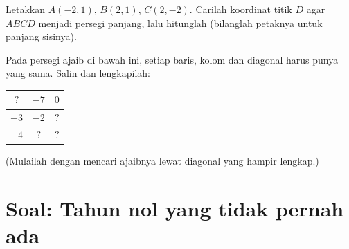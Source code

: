 \begin{exercise}[$\star\star$]\label{exo:g7:negatives:11}
Letakkan $A(-2, 1)$, $B(2, 1)$, $C(2, -2)$. Carilah koordinat titik
$D$ agar $ABCD$ menjadi persegi panjang, lalu hitunglah 
(bilanglah petaknya untuk panjang sisinya).
\end{exercise}

\begin{exercise}[$\star\star\star$]\label{exo:g7:negatives:12}
Pada persegi ajaib di bawah ini, setiap baris, kolom dan diagonal
harus punya  yang sama. Salin dan lengkapilah:
\begin{center}
\renewcommand{\arraystretch}{1.4}
\begin{tabular}{|c|c|c|}
\hline
$?$ & $-7$ & $0$ \\
\hline
$-3$ & $-2$ & $?$ \\
\hline
$-4$ & $?$ & $?$ \\
\hline
\end{tabular}
\end{center}
(Mulailah dengan mencari  ajaibnya lewat diagonal yang hampir
lengkap.)
\end{exercise}

\section{Soal: Tahun nol yang tidak pernah ada}

